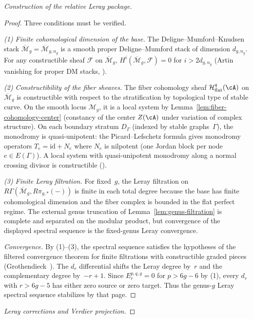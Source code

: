 \begin{proof}[Construction of the relative Leray package]
\begin{proof}
Three conditions must be verified.

\emph{(1) Finite cohomological dimension of the base.}
The Deligne--Mumford--Knudsen stack
$\overline{\mathcal{M}}_g=\overline{\mathcal M}_{g,n_g}$ is a smooth
proper Deligne--Mumford stack of dimension $d_{g,n_g}$. For any
constructible sheaf $\mathcal{F}$ on
$\overline{\mathcal{M}}_g$,
$H^i(\overline{\mathcal{M}}_g, \mathcal{F}) = 0$ for
$i > 2d_{g,n_g}$
(Artin vanishing for proper DM stacks,
\cite[\S4.1]{Olsson16}).

\emph{(2) Constructibility of the fiber sheaves.}
The fiber cohomology sheaf
$\mathcal{H}^q_{\mathrm{flat}}(\cA)$ on
$\overline{\mathcal{M}}_g$ is constructible with respect to
the stratification by topological type of stable curve.
On the smooth locus $\mathcal{M}_g$, it is a local system
by Lemma~\ref{lem:fiber-cohomology-center} (constancy of
the center $Z(\cA)$ under variation of complex structure).
On each boundary stratum $D_\Gamma$
(indexed by stable graphs~$\Gamma$), the monodromy
is quasi-unipotent: the Picard--Lefschetz formula gives
monodromy operators $T_e = \mathrm{id} + N_e$ where $N_e$
is nilpotent (one Jordan block per node
$e \in E(\Gamma)$). A local system with quasi-unipotent
monodromy along a normal crossing divisor is constructible
(\cite[\S8.1]{KS90}).

\emph{(3) Finite Leray filtration.}
For fixed~$g$, the Leray filtration on
$R\Gamma(\overline{\mathcal{M}}_g,R\pi_{g,*}(-))$ is finite in each
total degree because the base has finite cohomological dimension and
the fiber complex is bounded in the flat perfect regime. The external
genus truncation of Lemma~\ref{lem:genus-filtration} is complete and
separated on the modular product, but convergence of the displayed
spectral sequence is the fixed-genus Leray convergence.

\emph{Convergence.} By (1)--(3), the spectral sequence
satisfies the hypotheses of the filtered convergence theorem
for finite filtrations with constructible graded pieces
(Grothendieck~\cite[\S II.4.17]{Tohoku}). The $d_r$
differential shifts the Leray degree by~$r$ and the complementary
degree by~$-r+1$. Since $E_r^{p,q,g}=0$ for $p>6g-6$ by (1), every
$d_r$ with $r>6g-5$ has either zero source or zero target. Thus the
genus-$g$ Leray spectral sequence stabilizes by that page.
\end{proof}

\emph{Leray corrections and Verdier projection.}


\end{proof}
